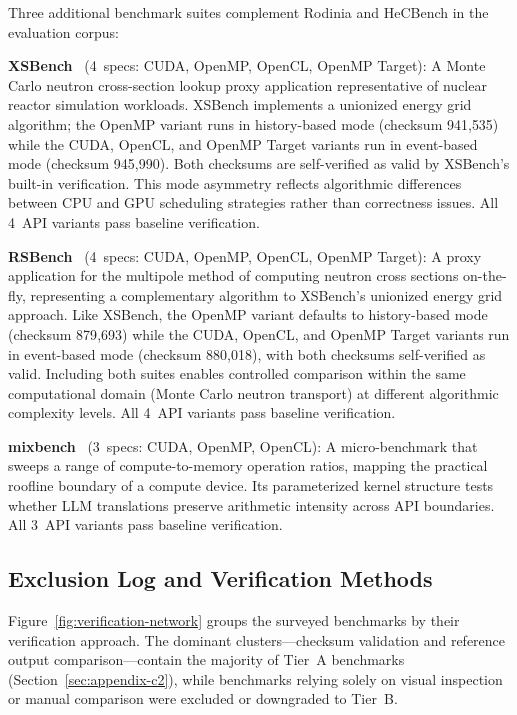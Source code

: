 Three additional benchmark suites complement Rodinia and HeCBench in the evaluation corpus:

\textbf{XSBench}~\cite{XSBench2014} (4~specs: CUDA, OpenMP, OpenCL, OpenMP Target): A Monte Carlo neutron cross-section lookup proxy application representative of nuclear reactor simulation workloads. XSBench implements a unionized energy grid algorithm; the OpenMP variant runs in history-based mode (checksum 941{,}535) while the CUDA, OpenCL, and OpenMP Target variants run in event-based mode (checksum 945{,}990). Both checksums are self-verified as valid by XSBench's built-in verification. This mode asymmetry reflects algorithmic differences between CPU and GPU scheduling strategies rather than correctness
issues. All 4~API variants pass baseline verification.

\textbf{RSBench}~\cite{RSBench2015} (4~specs: CUDA, OpenMP, OpenCL, OpenMP Target): A proxy application for the multipole method of computing neutron cross sections on-the-fly, representing a complementary algorithm to XSBench's unionized energy grid approach. Like XSBench, the OpenMP variant defaults to history-based mode (checksum 879{,}693) while the CUDA, OpenCL, and OpenMP Target variants run in event-based mode (checksum 880{,}018), with both checksums self-verified as valid. Including both suites enables controlled comparison within the same computational domain (Monte Carlo neutron transport) at different algorithmic complexity levels. All 4~API variants pass baseline verification.

\textbf{mixbench}~\cite{mixbench2017} (3~specs: CUDA, OpenMP, OpenCL): A micro-benchmark that sweeps a range of compute-to-memory operation ratios, mapping the practical roofline boundary of a compute device. Its parameterized kernel structure tests whether LLM translations preserve arithmetic intensity across API boundaries. All 3~API variants pass baseline verification.

\subsection{Exclusion Log and Verification Methods}
  \label{sec:appendix-c6}

  Figure~\ref{fig:verification-network} groups the surveyed benchmarks by their
  verification approach. The dominant clusters---checksum validation and reference
  output comparison---contain the majority of Tier~A benchmarks
  (Section~\ref{sec:appendix-c2}), while benchmarks relying solely on visual
  inspection or manual comparison were excluded or downgraded to Tier~B.

